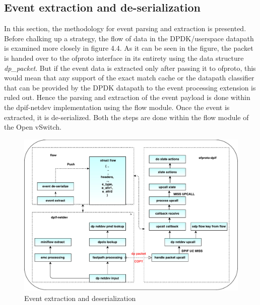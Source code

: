 \subsection{Event extraction and de-serialization}
In this section, the methodology for event parsing and extraction is presented. Before chalking up a strategy, the flow of data in the DPDK/userspace datapath is examined more closely in figure 4.4. As it can be seen in the figure, the packet is handed over to the ofproto interface in its entirety using the data structure \textit{dp_packet}. But if the event data is extracted only after passing it to ofproto, this would mean that any support of the exact match cache or the datapath classifier that can be provided by the DPDK datapath to the event processing extension is ruled out. Hence the parsing and extraction of the event payload is done within the dpif-netdev implementation using the flow module. Once the event is extracted, it is de-serialized. Both the steps are done within the flow module of the Open vSwitch. 

\begin{figure}[H]
 \centering
 \caption{Event extraction and deserialization}
 \includegraphics[height=8cm]{flowextract01.pdf}
\end{figure}

